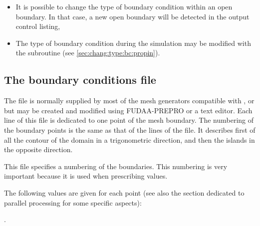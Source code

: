 \begin{itemize}
\item It is possible to change the type of boundary condition within an open
boundary.
In that case, a new open boundary will be detected in the output control listing,

\item The type of boundary condition during the simulation may be modified with
the  subroutine (see \ref{sec:chang:type:bc:propin}).
\end{itemize}


\subsection{The boundary conditions file}
\label{sub:bc:file}
The file is normally supplied by most of the mesh generators compatible
with \tel, or \stbtel 
but may be created and modified using FUDAA-PREPRO or a text editor.
Each line of this file is dedicated to one point of the mesh boundary.
The numbering of the boundary points is the same as that of the lines of the
file.
It describes first of all the contour of the domain in a trigonometric direction,
and then the islands in the opposite direction.

This file specifies a numbering of the boundaries.
This numbering is very important because it is used when prescribing values.

The following values are given for each point
(see also the section dedicated to parallel processing for some specific aspects):

.

